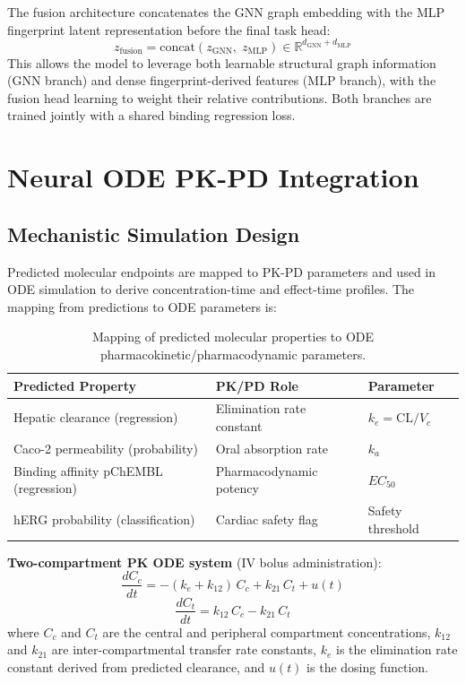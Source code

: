 \documentclass[a4paper,11pt,twoside]{report}
\begin{document}
The fusion architecture concatenates the GNN graph embedding with the MLP fingerprint latent representation before the final task head:
\begin{equation}
z_\text{fusion} = \text{concat}\left(z_\text{GNN},\; z_\text{MLP}\right) \in \mathbb{R}^{d_\text{GNN} + d_\text{MLP}}
\end{equation}
This allows the model to leverage both learnable structural graph information (GNN branch) and dense fingerprint-derived features (MLP branch), with the fusion head learning to weight their relative contributions. Both branches are trained jointly with a shared binding regression loss.

\section{Neural ODE PK-PD Integration}

\subsection{Mechanistic Simulation Design}

Predicted molecular endpoints are mapped to PK-PD parameters and used in ODE simulation to derive concentration-time and effect-time profiles. The mapping from predictions to ODE parameters is:

\begin{table}[htbp]
\centering
\small
\caption{Mapping of predicted molecular properties to ODE pharmacokinetic/pharmacodynamic parameters.}
\label{tab:pkpd_mapping}
\begin{tabular}{l|l|l}
\hline
\textbf{Predicted Property} & \textbf{PK/PD Role} & \textbf{Parameter} \\
\hline
Hepatic clearance (regression) & Elimination rate constant & $k_e = \text{CL}/V_c$ \\
Caco-2 permeability (probability) & Oral absorption rate & $k_a$ \\
Binding affinity pChEMBL (regression) & Pharmacodynamic potency & $EC_{50}$ \\
hERG probability (classification) & Cardiac safety flag & Safety threshold \\
\hline
\end{tabular}
\end{table}

\noindent \textbf{Two-compartment PK ODE system} (IV bolus administration):
\begin{equation}
\frac{dC_c}{dt} = -(k_e + k_{12})\,C_c + k_{21}\,C_t + u(t)
\end{equation}
\begin{equation}
\frac{dC_t}{dt} = k_{12}\,C_c - k_{21}\,C_t
\end{equation}
where $C_c$ and $C_t$ are the central and peripheral compartment concentrations, $k_{12}$ and $k_{21}$ are inter-compartmental transfer rate constants, $k_e$ is the elimination rate constant derived from predicted clearance, and $u(t)$ is the dosing function.
\end{document}
